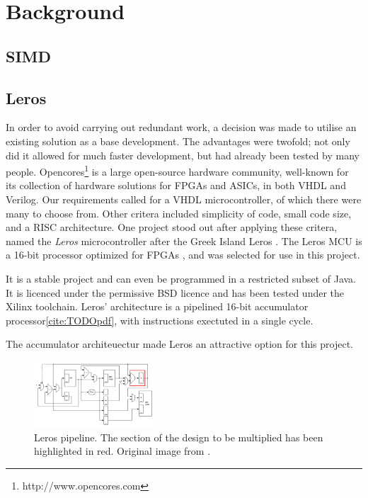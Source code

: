 \section{Background}
\subsection{SIMD}
\subsection{Leros}
In order to avoid carrying out redundant work, a decision was made to utilise an
existing solution as a base development. The advantages were twofold; not only
did it allowed for much faster development, but had already been tested by many
people. Opencores\footnote{
http://www.opencores.com
}
is a large open-source hardware community, well-known for its collection of hardware solutions for
FPGAs and ASICs, in both VHDL and Verilog. Our requirements called for a VHDL
microcontroller, of which there were many to choose from. Other critera included
simplicity of code, small code size, and a RISC architecture. One project stood out
after applying these critera, named the \emph{Leros} microcontroller after the
Greek Island Leros \cite{cite:TODO}.  The Leros MCU is a 16-bit
processor optimized for FPGAs \cite{cite:TODO}, and was selected for use in this
project.

 It is a stable
project and can even be programmed in a restricted subset of Java. It is licenced
under the permissive BSD licence and has been tested under the Xilinx toolchain.
Leros' architecture is a pipelined 16-bit accumulator processor\ref{cite:TODOpdf},
with instructions exectuted in a single cycle.

The accumulator architeuectur made Leros an attractive option for this project.

\begin{figure}[h]
\center
\includegraphics[width=0.4\textwidth]{images/leros-system}
\caption{Leros pipeline. The section of the design to be multiplied has been
highlighted in red. Original image from \cite{cite:TODO-pdf}.
}
\label{fig:leros-system}
\end{figure}
